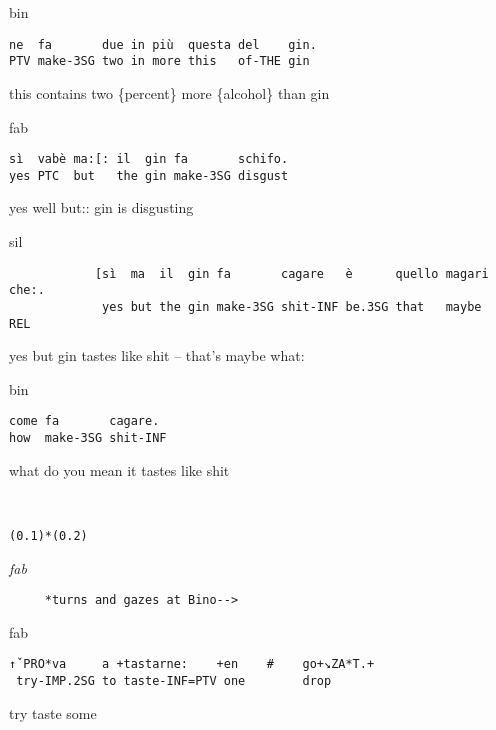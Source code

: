 \documentclass[output=paper,modfonts]{langscibook}
\begin{document}
\vspace{2mm}
%
\begin{transbox}{1}{bin}
\begin{verbatim}
ne  fa       due in più  questa del    gin.
PTV make-3SG two in more this   of-THE gin
\end{verbatim}
this contains two \{percent\} more \{alcohol\} than gin
\end{transbox}\vspace{1mm}
%
\vspace{-0.5mm}
%
\begin{transbox}{3}{fab}
\begin{verbatim}
sì  vabè ma:[: il  gin fa       schifo.
yes PTC  but   the gin make-3SG disgust
\end{verbatim}
yes well but:: gin is disgusting
\end{transbox}\vspace{1mm}
%
\begin{transbox}{4}{sil}
\begin{verbatim}
            [sì  ma  il  gin fa       cagare   è      quello magari che:.
             yes but the gin make-3SG shit-INF be.3SG that   maybe  REL
\end{verbatim}
\hspace{1.85cm} yes but gin tastes like shit -- that's maybe what:
\end{transbox}\vspace{1mm}
%
\begin{transbox}{5}{bin}
\begin{verbatim}
come fa       cagare.
how  make-3SG shit-INF
\end{verbatim}
what do you mean it tastes like shit
\end{transbox}\vspace{1mm}
%
\begin{transbox}{6}{~}
\begin{verbatim}
(0.1)*(0.2)
\end{verbatim}
\end{transbox}
%
\begin{transbox}{7}{\textit{fab}}
\begin{verbatim}
     *turns and gazes at Bino-->
\end{verbatim}
\end{transbox}
%
\begin{mdframednoverticalspace}[style=firstfoc]
\begin{transbox}{8}{fab}
\begin{verbatim} 
↑ˇPRO*va     a +tastarne:    +en    #    go+↘ZA*T.+
 try-IMP.2SG to taste-INF=PTV one        drop
\end{verbatim}
\hspace{0.07cm} try taste some
\end{transbox}
\end{mdframednoverticalspace}\vspace{1mm}
\end{document}
